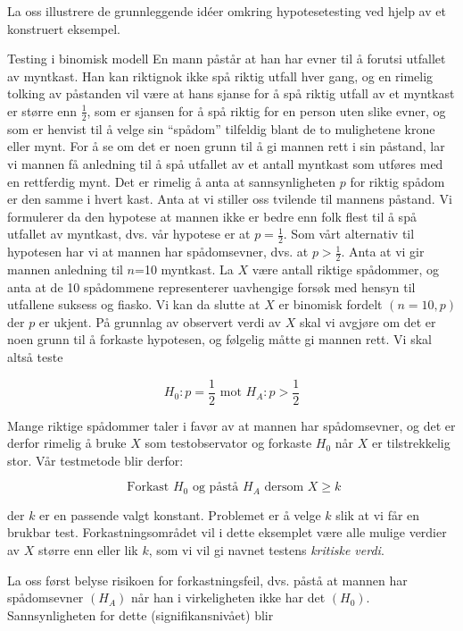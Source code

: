 La oss illustrere de grunnleggende id\'{e}er omkring hypotesetesting
ved hjelp av et konstruert eksempel.\\

\begin{eksempel}{Testing i binomisk modell}
En mann påstår at han har evner til å forutsi utfallet av
myntkast. Han kan riktignok ikke spå riktig utfall hver gang, og en
rimelig tolking av påstanden vil være at hans sjanse for å spå
riktig utfall av et myntkast er større enn $\frac{1}{2}$,
som er sjansen for å spå riktig for en person uten slike evner,
og som er henvist til å velge sin ``spådom'' tilfeldig blant de
to mulighetene krone eller mynt. For å se om det er noen grunn
til å gi mannen rett i sin påstand, lar vi mannen få anledning
til å spå utfallet av et antall myntkast som utføres med en
rettferdig mynt. Det er rimelig å anta at sannsynligheten $p$ for
riktig spådom er den samme i hvert kast.
Anta  at vi stiller oss tvilende til mannens
påstand. Vi formulerer da den hypotese at mannen ikke er bedre
enn folk flest til å spå utfallet av myntkast, dvs. vår hypotese
er at $p=\frac{1}{2}$. Som vårt alternativ til hypotesen har vi at
mannen har spådomsevner, dvs. at $p >\frac{1}{2}$.
Anta at vi gir mannen anledning til $n$=10 myntkast. La $X$ være antall
riktige spådommer, og anta at de 10 spådommene representerer
uavhengige forsøk med hensyn til utfallene suksess og fiasko.
Vi kan da slutte at $X$ er binomisk fordelt $(n=10,p)$
der $p$ er ukjent. På grunnlag av
observert verdi av $X$ skal vi avgjøre om det er noen grunn til å
forkaste hypotesen, og følgelig måtte gi mannen rett.
Vi skal altså teste

\[ H_0 : p=\frac{1}{2} \mbox{\ \ mot \ \ } H_A : p> \frac{1}{2} \]

\noindent Mange riktige spådommer taler i favør av at
mannen har spådomsevner, og det er derfor rimelig å bruke $X$ som
testobservator og forkaste $H_0$ når $X$ er tilstrekkelig stor.
Vår testmetode blir derfor:

\[    \mbox{\ Forkast $H_0$ og påstå $H_A$ dersom $X\geq k$} \]

\noindent der $k$ er en passende valgt konstant. Problemet er å velge $k$
 slik at vi får en brukbar test. Forkastningsområdet vil i dette
eksemplet være alle mulige verdier av $X$ større enn eller lik $k$,
 som vi vil gi navnet testens {\em kritiske verdi}.

La oss først belyse risikoen for forkastningsfeil, dvs. påstå at
mannen har spådomsevner $(H_A)$ når han i virkeligheten ikke har
det $(H_0)$. Sannsynligheten for dette (signifikansnivået) blir


\end{eksempel}
